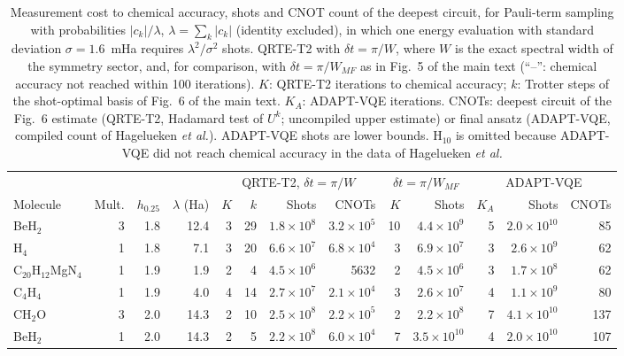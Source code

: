 \begin{table}[!htbp]
\centering
\color{red}
\scriptsize
\setlength{\tabcolsep}{3pt}
\renewcommand{\arraystretch}{0.90}
\caption{Measurement cost to chemical accuracy, shots and CNOT count of the deepest circuit, for Pauli-term sampling with probabilities $|c_k|/\lambda$, $\lambda=\sum_k|c_k|$ (identity excluded), in which one energy evaluation with standard deviation $\sigma=1.6$~mHa requires $\lambda^2/\sigma^2$ shots. QRTE-T2 with $\delta t=\pi/W$, where $W$ is the exact spectral width of the symmetry sector, and, for comparison, with $\delta t=\pi/W_{MF}$ as in Fig.~5 of the main text (``--'': chemical accuracy not reached within 100 iterations). $K$: QRTE-T2 iterations to chemical accuracy; $k$: Trotter steps of the shot-optimal basis of Fig.~6 of the main text. $K_A$: ADAPT-VQE iterations. CNOTs: deepest circuit of the Fig.~6 estimate (QRTE-T2, Hadamard test of $U^k$; uncompiled upper estimate) or final ansatz (ADAPT-VQE, compiled count of Hagelueken \emph{et al.}). ADAPT-VQE shots are lower bounds. H$_{10}$ is omitted because ADAPT-VQE did not reach chemical accuracy in the data of Hagelueken \emph{et al.}}
\label{tab:shots}
\begin{tabular}{lrrrrrrrrrrrr}
\toprule
 & & & & \multicolumn{4}{c}{QRTE-T2, $\delta t=\pi/W$} & \multicolumn{2}{c}{$\delta t=\pi/W_{MF}$} & \multicolumn{3}{c}{ADAPT-VQE} \\
\cmidrule(lr){5-8}\cmidrule(lr){9-10}\cmidrule(lr){11-13}
Molecule & Mult. & $h_{0.25}$ & $\lambda$ (Ha) & $K$ & $k$ & Shots & CNOTs & $K$ & Shots & $K_A$ & Shots & CNOTs \\
\midrule
BeH$_2$ & 3 & 1.8 & 12.4 & 3 & 29 & $1.8\times10^{8}$ & $3.2\times10^{5}$ & 10 & $4.4\times10^{9}$ & 5 & $2.0\times10^{10}$ & 85 \\
H$_4$ & 1 & 1.8 & 7.1 & 3 & 20 & $6.6\times10^{7}$ & $6.8\times10^{4}$ & 3 & $6.9\times10^{7}$ & 3 & $2.6\times10^{9}$ & 62 \\
C$_{20}$H$_{12}$MgN$_4$ & 1 & 1.9 & 1.9 & 2 & 4 & $4.5\times10^{6}$ & 5632 & 2 & $4.5\times10^{6}$ & 3 & $1.7\times10^{8}$ & 62 \\
C$_4$H$_4$ & 1 & 1.9 & 4.0 & 4 & 14 & $2.7\times10^{7}$ & $2.1\times10^{4}$ & 3 & $2.6\times10^{7}$ & 4 & $1.1\times10^{9}$ & 80 \\
CH$_2$O & 3 & 2.0 & 14.3 & 2 & 10 & $2.5\times10^{8}$ & $2.2\times10^{5}$ & 2 & $2.2\times10^{8}$ & 7 & $4.1\times10^{10}$ & 137 \\
BeH$_2$ & 1 & 2.0 & 14.3 & 2 & 5 & $2.2\times10^{8}$ & $6.0\times10^{4}$ & 7 & $3.5\times10^{10}$ & 4 & $2.0\times10^{10}$ & 107 \\

\end{tabular}
\end{table}
